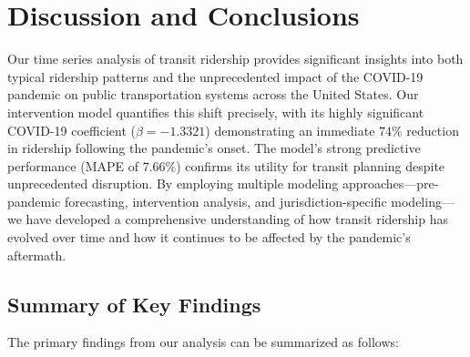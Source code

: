 \documentclass[11pt]{article}
\begin{document}
\section{Discussion and Conclusions}

Our time series analysis of transit ridership provides significant insights into both typical ridership patterns and the unprecedented impact of the COVID-19 pandemic on public transportation systems across the United States. Our intervention model quantifies this shift precisely, with its highly significant COVID-19 coefficient ($\beta = -1.3321$) demonstrating an immediate $74\%$ reduction in ridership following the pandemic's onset. The model's strong predictive performance (MAPE of $7.66\%$) confirms its utility for transit planning despite unprecedented disruption. By employing multiple modeling approaches—pre-pandemic forecasting, intervention analysis, and jurisdiction-specific modeling—we have developed a comprehensive understanding of how transit ridership has evolved over time and how it continues to be affected by the pandemic's aftermath.

\subsection{Summary of Key Findings}

The primary findings from our analysis can be summarized as follows:
\end{document}
